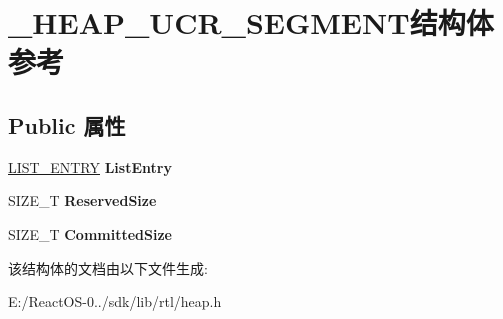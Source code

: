 \hypertarget{struct___h_e_a_p___u_c_r___s_e_g_m_e_n_t}{}\section{\+\_\+\+H\+E\+A\+P\+\_\+\+U\+C\+R\+\_\+\+S\+E\+G\+M\+E\+N\+T结构体 参考}
\label{struct___h_e_a_p___u_c_r___s_e_g_m_e_n_t}
\subsection*{Public 属性}
\begin{DoxyCompactItemize}
\item 
\mbox{\label{struct___h_e_a_p___u_c_r___s_e_g_m_e_n_t_a5c7f23b0952029b9c640a0398580fb0c}} 
\hyperlink{struct___l_i_s_t___e_n_t_r_y}{L\+I\+S\+T\+\_\+\+E\+N\+T\+RY} {\bfseries List\+Entry}
\item 
\mbox{\label{struct___h_e_a_p___u_c_r___s_e_g_m_e_n_t_a8acb83e768e65a8adc153a70c2f4c2fb}} 
S\+I\+Z\+E\+\_\+T {\bfseries Reserved\+Size}
\item 
\mbox{\label{struct___h_e_a_p___u_c_r___s_e_g_m_e_n_t_a3e3969d2fcaaeaf2d4af9baf98b6e74a}} 
S\+I\+Z\+E\+\_\+T {\bfseries Committed\+Size}
\end{DoxyCompactItemize}


该结构体的文档由以下文件生成\+:\begin{DoxyCompactItemize}
\item 
E\+:/\+React\+O\+S-\/0../sdk/lib/rtl/heap.\+h\end{DoxyCompactItemize}
